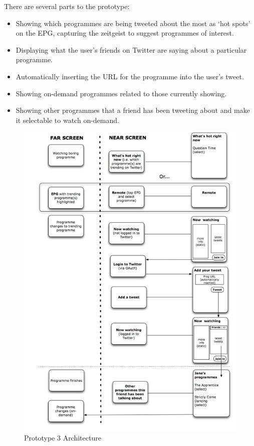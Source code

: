 \documentclass{notube}
\begin{document}
There are several parts to the prototype: 

\begin{itemize}
\item{Showing which programmes are being tweeted about the most as `hot spots' on the EPG, capturing the zeitgeist to suggest programmes of interest.}
\item{Displaying what the user's friends on Twitter are saying about a particular programme.}
\item{Automatically inserting the URL for the programme into the user's tweet.}
\item{Showing on-demand programmes related to those currently showing.}
\item{Showing other programmes that a friend has been tweeting about and make it selectable to watch on-demand.}
\end{itemize}

\begin{figure}[htbp]
\begin{center}
\includegraphics[width=6in]{images/p3arch.png}
\caption{Prototype 3 Architecture} \label{fig:arch}
\end{center}
\end{figure}
\end{document}

